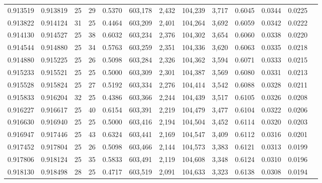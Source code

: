 \begin{tabular}{rrrrrrrrrrrrr}
0.913519 & 0.913819 &    25 &  29 &                                     0.5370 & 603,178 &   2,432 & 104,239 &   3,717 & 0.6045 & 0.0344 & 0.0225 \\
0.913822 & 0.914124 &    31 &  25 &                                     0.4464 & 603,209 &   2,401 & 104,264 &   3,692 & 0.6059 & 0.0342 & 0.0222 \\
0.914130 & 0.914527 &    25 &  38 &                                     0.6032 & 603,234 &   2,376 & 104,302 &   3,654 & 0.6060 & 0.0338 & 0.0220 \\
0.914544 & 0.914880 &    25 &  34 &                                     0.5763 & 603,259 &   2,351 & 104,336 &   3,620 & 0.6063 & 0.0335 & 0.0218 \\
0.914880 & 0.915225 &    25 &  26 &                                     0.5098 & 603,284 &   2,326 & 104,362 &   3,594 & 0.6071 & 0.0333 & 0.0215 \\
0.915233 & 0.915521 &    25 &  25 &                                     0.5000 & 603,309 &   2,301 & 104,387 &   3,569 & 0.6080 & 0.0331 & 0.0213 \\
0.915528 & 0.915824 &    25 &  27 &                                     0.5192 & 603,334 &   2,276 & 104,414 &   3,542 & 0.6088 & 0.0328 & 0.0211 \\
0.915833 & 0.916204 &    32 &  25 &                                     0.4386 & 603,366 &   2,244 & 104,439 &   3,517 & 0.6105 & 0.0326 & 0.0208 \\
0.916227 & 0.916617 &    25 &  40 &                                     0.6154 & 603,391 &   2,219 & 104,479 &   3,477 & 0.6104 & 0.0322 & 0.0206 \\
0.916630 & 0.916940 &    25 &  25 &                                     0.5000 & 603,416 &   2,194 & 104,504 &   3,452 & 0.6114 & 0.0320 & 0.0203 \\
0.916947 & 0.917446 &    25 &  43 &                                     0.6324 & 603,441 &   2,169 & 104,547 &   3,409 & 0.6112 & 0.0316 & 0.0201 \\
0.917452 & 0.917804 &    25 &  26 &                                     0.5098 & 603,466 &   2,144 & 104,573 &   3,383 & 0.6121 & 0.0313 & 0.0199 \\
0.917806 & 0.918124 &    25 &  35 &                                     0.5833 & 603,491 &   2,119 & 104,608 &   3,348 & 0.6124 & 0.0310 & 0.0196 \\
0.918130 & 0.918498 &    28 &  25 &                                     0.4717 & 603,519 &   2,091 & 104,633 &   3,323 & 0.6138 & 0.0308 & 0.0194 \\

\end{tabular}
